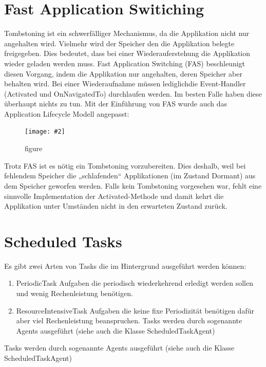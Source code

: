 \documentclass[a4paper,10pt]{scrreprt}
\newcommand{\pic}[2][figure]{\begin{figure}[h]
 \centering
 \texttt{[image: \#2]}
 \caption{#1}
\end{figure}
}
\begin{document}
\section{Fast Application Switiching}
Tombstoning ist ein schwerfälliger Mechanismus, da die Applikation nicht nur angehalten wird. Vielmehr wird
der Speicher den die Applikation belegte freigegeben. Dies bedeutet, dass bei einer Wiederauferstehung die
Applikation wieder geladen werden muss. Fast Application Switching (FAS) beschleunigt diesen Vorgang, indem
die Applikation nur angehalten, deren Speicher aber behalten wird. Bei einer Wiederaufnahme müssen lediglichdie Event-Handler (Activated und 
OnNavigatedTo) durchlaufen werden. Im besten Falle haben diese überhaupt
nichts zu tun. Mit der Einführung von FAS wurde auch das Application Lifecycle Modell angepasst:
\pic{modl.png}
Trotz FAS ist es nötig ein Tombstoning vorzubereiten. Dies deshalb, weil bei fehlendem Speicher die
„schlafenden“ Applikationen (im Zustand Dormant) aus dem Speicher geworfen werden. Falls kein Tombstoning
vorgesehen war, fehlt eine sinnvolle Implementation der Activated-Methode und damit kehrt die Applikation
unter Umständen nicht in den erwarteten Zustand zurück.

\section{Scheduled Tasks}
Es gibt zwei Arten von Tasks die im Hintergrund ausgeführt werden können:
\begin{enumerate}
\item  PeriodicTask
Aufgaben die periodisch wiederkehrend erledigt werden sollen und wenig Rechenleistung benötigen.
\item ResourceIntensiveTask
Aufgaben die keine fixe Periodizität benötigen dafür aber viel Rechenleistung beanspruchen.
Tasks werden durch sogenannte Agents ausgeführt (siehe auch die Klasse ScheduledTaskAgent)
\end{enumerate}
Tasks werden durch sogenannte Agents ausgeführt (siehe auch die Klasse ScheduledTaskAgent)
\end{document}

